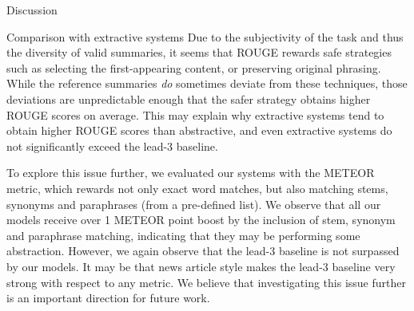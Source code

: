 \documentclass[11pt,a4paper]{article}
\begin{document}
\begin{section}{Discussion}
\begin{subsection}{Comparison with extractive systems}
Due to the subjectivity of the task and thus the diversity of valid summaries, it seems that ROUGE rewards safe strategies such as selecting the first-appearing content, or preserving original phrasing.
While the reference summaries \textit{do} sometimes deviate from these techniques, those deviations are unpredictable enough that the safer strategy obtains higher ROUGE scores on average.
This may explain why extractive systems tend to obtain higher ROUGE scores than abstractive, and even extractive systems do not significantly exceed the lead-3 baseline.

To explore this issue further, we evaluated our systems with the METEOR metric, which rewards not only exact word matches, but also matching stems, synonyms and paraphrases (from a pre-defined list). 
We observe that all our models receive over 1 METEOR point boost by the inclusion of stem, synonym and paraphrase matching, indicating that they may be performing some abstraction.
However, we again observe that the lead-3 baseline is not surpassed by our models.
It may be that news article style makes the lead-3 baseline very strong with respect to any metric.
We believe that investigating this issue further is an important direction for future work.
\end{subsection}

\begin{figure}[t]
\centering


\end{figure}
\end{section}
\end{document}
